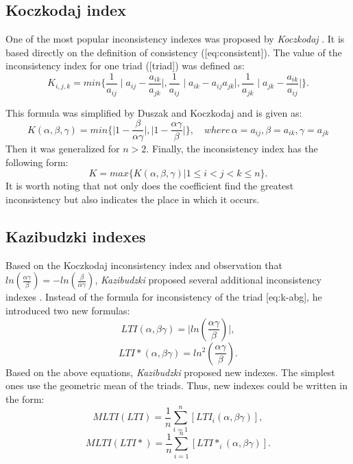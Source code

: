 \subsection{Koczkodaj index}

One of the most popular inconsistency indexes was proposed by \textit{Koczkodaj} \cite{KOCZKODAJ1993}. It is based directly on the definition of consistency ([eq:consistent]). The value of the inconsistency index for one triad ([triad]) was defined as:
	\begin{equation} 
		K_{i,j,k}=min\{\frac{1}{a_{ij}}\mid a_{ij}-\frac{a_{ik}}{a_{jk}}\mid,\frac{1}{a_{ij}}\mid a_{ik}-a_{ij}a_{jk}\mid,\frac{1}{a_{jk}}\mid a_{jk}-\frac{a_{ik}}{a_{ij}}\mid\}.
	 \end{equation}

 This formula was simplified by Duszak and Koczkodaj \cite{DUSZAK1994} and is given as:
 	\begin{equation} 
		K(\alpha,\beta,\gamma)=min\{\mid1-\frac{\beta}{\alpha\gamma}\mid,\mid1-\frac{\alpha\gamma}{\beta}\mid\},\,\,\,\,\,\,where\,\alpha=a_{ij},\beta=a_{ik},\gamma=a_{jk}
	 \end{equation}
 Then it was generalized \cite{DUSZAK1994} for $n>2$. Finally, the inconsistency index has the following form:
 	\begin{equation} 
		K=max\{K(\alpha,\beta,\gamma)|1\leq i<j<k\leq n\}.
	 \end{equation}
 It is worth noting that not only does the coefficient find the greatest inconsistency but also indicates the place in which it occurs.


\subsection{Kazibudzki indexes}

Based on the Koczkodaj inconsistency index and observation that $ln(\frac{\alpha\gamma}{\beta})=-ln(\frac{\beta}{\alpha\gamma})$, \textit{Kazibudzki} proposed several additional inconsistency indexes \cite{Kazibudzki2016}. Instead of the formula for inconsistency of the triad [eq:k-abg], he introduced two new formulas:
	\begin{equation} 
		LTI(\alpha,\beta\gamma)=\mid ln(\frac{\alpha\gamma}{\beta})\mid,
	 \end{equation}
	\begin{equation} 
		LTI*(\alpha,\beta\gamma)=ln^{2}(\frac{\alpha\gamma}{\beta}).
	 \end{equation}
Based on the above equations, \textit{Kazibudzki} proposed new indexes. The simplest ones use the geometric mean of the triads. Thus, new indexes could be written in the form:
	\begin{equation} 
		MLTI(LTI)=\frac{1}{n}\sum_{i=1}^{n}\left[LTI_{i}(\alpha,\beta\gamma)\right],
	 \end{equation}
 	\begin{equation} 
		MLTI(LTI*)=\frac{1}{n}\sum_{i=1}^{n}\left[LTI*_{i}(\alpha,\beta\gamma)\right].
			 \end{equation}
 

